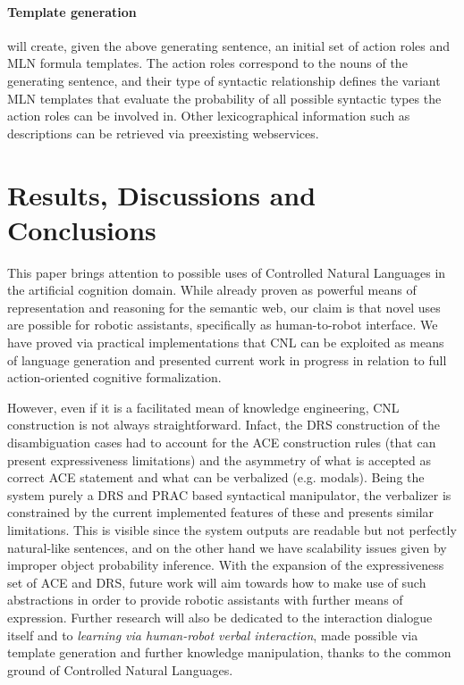 \documentclass[oribibl]{llncs}
\begin{document}
\paragraph{Template generation} will create, given the above generating sentence, an initial set of action roles and MLN formula templates.  
The action roles correspond to the nouns of the generating sentence, 
and their type of syntactic relationship defines the variant MLN 
templates that evaluate the probability of all possible syntactic 
types the action roles can be involved in. Other lexicographical 
information such as descriptions can be retrieved via preexisting 
webservices.

\section{Results, Discussions and Conclusions}
This paper brings attention to possible uses of Controlled Natural Languages in the artificial cognition domain. While already proven as powerful means of representation and reasoning for the semantic web\cite{kaljurand:phd}, our claim is that novel uses are possible for robotic assistants, specifically as human-to-robot interface.
We have proved via practical implementations that CNL can be exploited as means of language generation and presented current work in progress in relation to full action-oriented cognitive formalization.

However, even if it is a facilitated mean of knowledge engineering, CNL construction is not always straightforward\cite{Schwitter05alayered}. Infact, the DRS construction of the disambiguation cases had to account for the ACE construction rules (that can present expressiveness limitations) and the asymmetry of what is accepted as correct ACE statement and what can be verbalized (e.g. modals). Being the system purely a DRS and PRAC based syntactical manipulator, the verbalizer is constrained by the current implemented features of these and presents similar limitations. This is visible since the system outputs are readable but not perfectly natural-like sentences, and on the other hand we have scalability issues given by improper object probability inference.
With the expansion of the expressiveness set of ACE and DRS, future work will aim towards how to make use of such abstractions in order to provide robotic assistants with further means of expression.
Further research will also be dedicated to the interaction dialogue itself and to \textit{learning via human-robot verbal interaction}, made possible via template generation and further knowledge manipulation, thanks to the common ground of Controlled Natural Languages.

%
{}

%
\end{document}
